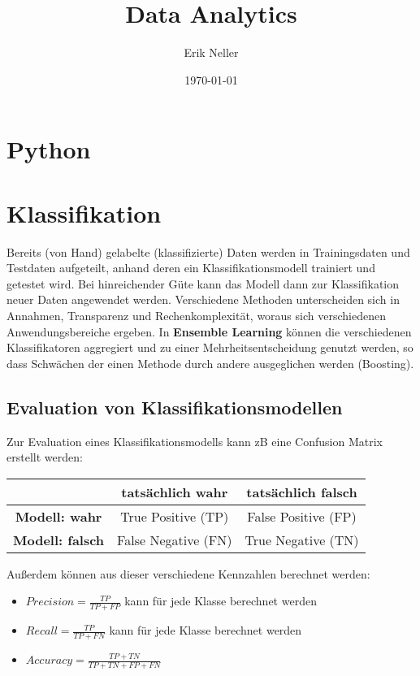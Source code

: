 \documentclass{article}
\title{Data Analytics}
\author{Erik Neller}
\date{\today}
\begin{document}
\maketitle

\section{Python}
\section{Klassifikation}
Bereits (von Hand) gelabelte (klassifizierte) Daten werden in Trainingsdaten und Testdaten aufgeteilt, anhand deren ein Klassifikationsmodell trainiert und getestet wird.
Bei hinreichender Güte kann das Modell dann zur Klassifikation neuer Daten angewendet werden.
Verschiedene Methoden unterscheiden sich in Annahmen, Transparenz und Rechenkomplexität, woraus sich verschiedenen Anwendungsbereiche ergeben.
In \textbf{Ensemble Learning} können die verschiedenen Klassifikatoren aggregiert und zu einer Mehrheitsentscheidung genutzt werden, 
so dass Schwächen der einen Methode durch andere ausgeglichen werden (Boosting).


\subsection{Evaluation von Klassifikationsmodellen}
Zur Evaluation eines Klassifikationsmodells kann zB eine Confusion Matrix erstellt werden:
\begin{center}
\begin{tabular}{|c|c|c|}
    \hline
    & \textbf{tatsächlich wahr} & \textbf{tatsächlich falsch} \\
    \hline
    \textbf{Modell: wahr}& True Positive (TP) & False Positive (FP) \\
    \hline
    \textbf{Modell: falsch} & False Negative (FN) & True Negative (TN) \\
    \hline
\end{tabular}
\end{center}

Außerdem können aus dieser verschiedene Kennzahlen berechnet werden:
\begin{itemize}
    \item $ Precision = \frac{TP}{TP+FP} $ kann für jede Klasse berechnet werden
    \item $ Recall = \frac{TP}{TP+FN} $ kann für jede Klasse berechnet werden
    \item $ Accuracy =  \frac{TP+TN}{TP+TN+FP+FN} $
\end{itemize}
\end{document}
